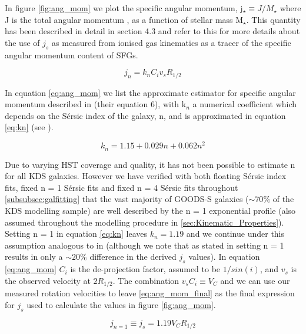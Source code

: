 \documentclass[fleqn,usenatbib]{mn2e}
\newcommand{\Sers}{S\'{e}rsic }
\begin{document}
In figure \ref{fig:ang_mom} we plot the specific angular momentum, j$_{\star} \equiv J/M_{\star}$ where J is the total angular momentum \citep{Fall1983}, as a function of stellar mass M$_{\star}$.
This quantity has been described in detail in \cite{Harrison2017} section 4.3 and refer to this for more details about the use of $j_{s}$ as measured from ionised gas kinematics as a tracer of the specific angular momentum content of SFGs.

\begin{equation}\label{eq:ang_mom}
   j_{n} = k_{n}C_{i}v_{s}R_{1/2}
\end{equation}

In equation \ref{eq:ang_mom} we list the approximate estimator for specific angular momentum described in \cite{Romanowsky2012} (their equation 6), with k$_{n}$ a numerical coefficient which depends on the \Sers index of the galaxy, n, and is approximated in equation \ref{eq:kn} (see \cite{Romanowsky2012}).

\begin{equation}\label{eq:kn}
   k_{n} = 1.15 + 0.029n + 0.062n^{2}
\end{equation}

Due to varying HST coverage and quality, it has not been possible to estimate n for all KDS galaxies.
However we have verified with both floating \Sers index fits, fixed n = 1 \Sers fits and fixed n = 4 \Sers fits throughout \cref{subsubsec:galfitting} that the vast majority of GOODS-S galaxies ($\sim70\%$ of the KDS modelling sample) are well described by the n = 1 exponential profile (also assumed throughout the modelling procedure in \cref{sec:Kinematic_Properties}).
Setting n = 1 in equation \ref{eq:kn} leaves $k_{n} = 1.19$ and we continue under this assumption analogous to in \cite{Harrison2017} (although we note that as stated in \cite{Harrison2017} setting n = 1 results in only a $\sim20\%$ difference in the derived $j_{s}$ values).
In equation \ref{eq:ang_mom} $C_{i}$ is the de-projection factor, assumed to be $1/sin(i)$, and $v_{s}$ is the observed velocity at $2R_{1/2}$.
The combination $v_{s}C_{i} \equiv V_{C}$ and we can use our measured rotation velocities to leave \ref{eq:ang_mom_final} as the final expression for $j_{s}$ used to calculate the values in figure \ref{fig:ang_mom}. 

\begin{equation}\label{eq:ang_mom_final}
   j_{n=1} \equiv j_{s} = 1.19V_{C}R_{1/2}
\end{equation}
\end{document}
